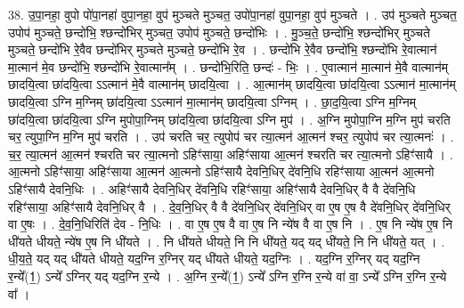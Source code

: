 \documentclass[17pt]{extarticle}
\begin{document}
38. उ॒पा॒नहा॒ वुपो पो॑पा॒नहा॑ वुपा॒नहा॒ वुप॑ मुञ्चते मुञ्चत॒ उपो॑पा॒नहा॑ वुपा॒नहा॒ वुप॑ मुञ्चते । . उप॑ मुञ्चते मुञ्चत॒ उपोप॑ मुञ्चते॒ छन्दो॑भि॒ श्छन्दो॑भिर् मुञ्चत॒ उपोप॑ मुञ्चते॒ छन्दो॑भिः । . मु॒ञ्च॒ते॒ छन्दो॑भि॒ श्छन्दो॑भिर् मुञ्चते मुञ्चते॒ छन्दो॑भि रे॒वैव छन्दो॑भिर् मुञ्चते मुञ्चते॒ छन्दो॑भि रे॒व । . छन्दो॑भि रे॒वैव छन्दो॑भि॒ श्छन्दो॑भि रे॒वात्मान॑ मा॒त्मान॑ मे॒व छन्दो॑भि॒ श्छन्दो॑भि रे॒वात्मान᳚म् । . छन्दो॑भि॒रिति॒ छन्दः॑ - भिः॒ । . ए॒वात्मान॑ मा॒त्मान॑ मे॒वै वात्मान॑म् छादयि॒त्वा छा॑दयि॒त्वा ऽऽत्मान॑ मे॒वै वात्मान॑म् छादयि॒त्वा । . आ॒त्मान॑म् छादयि॒त्वा छा॑दयि॒त्वा ऽऽत्मान॑ मा॒त्मान॑म् छादयि॒त्वा ऽग्नि म॒ग्निम् छा॑दयि॒त्वा ऽऽत्मान॑ मा॒त्मान॑म् छादयि॒त्वा ऽग्निम् । . छा॒द॒यि॒त्वा ऽग्नि म॒ग्निम् छा॑दयि॒त्वा छा॑दयि॒त्वा ऽग्नि मुपोपा॒ग्निम् छा॑दयि॒त्वा छा॑दयि॒त्वा ऽग्नि मुप॑ । . अ॒ग्नि मुपोपा॒ग्नि म॒ग्नि मुप॑ चरति चर॒ त्युपा॒ग्नि म॒ग्नि मुप॑ चरति । . उप॑ चरति चर॒ त्युपोप॑ चर त्या॒त्मन॑ आ॒त्मन॑ श्चर॒ त्युपोप॑ चर त्या॒त्मनः॑ । . च॒र॒ त्या॒त्मन॑ आ॒त्मन॑ श्चरति चर त्या॒त्मनो ऽहिꣳ॑साया॒ अहिꣳ॑साया आ॒त्मन॑ श्चरति चर त्या॒त्मनो ऽहिꣳ॑सायै । . आ॒त्मनो ऽहिꣳ॑साया॒ अहिꣳ॑साया आ॒त्मन॑ आ॒त्मनो ऽहिꣳ॑सायै देवनि॒धिर् दे॑वनि॒धि रहिꣳ॑साया आ॒त्मन॑ आ॒त्मनो ऽहिꣳ॑सायै देवनि॒धिः । . अहिꣳ॑सायै देवनि॒धिर् दे॑वनि॒धि रहिꣳ॑साया॒ अहिꣳ॑सायै देवनि॒धिर् वै वै दे॑वनि॒धि रहिꣳ॑साया॒ अहिꣳ॑सायै देवनि॒धिर् वै । . दे॒व॒नि॒धिर् वै वै दे॑वनि॒धिर् दे॑वनि॒धिर् वा ए॒ष ए॒ष वै दे॑वनि॒धिर् दे॑वनि॒धिर् वा ए॒षः । . दे॒व॒नि॒धिरिति॑ देव - नि॒धिः । . वा ए॒ष ए॒ष वै वा ए॒ष नि न्ये॑ष वै वा ए॒ष नि । . ए॒ष नि न्ये॑ष ए॒ष नि धी॑यते धीयते॒ न्ये॑ष ए॒ष नि धी॑यते । . नि धी॑यते धीयते॒ नि नि धी॑यते॒ यद् यद् धी॑यते॒ नि नि धी॑यते॒ यत् । . धी॒य॒ते॒ यद् यद् धी॑यते धीयते॒ यद॒ग्नि र॒ग्निर् यद् धी॑यते धीयते॒ यद॒ग्निः । . यद॒ग्नि र॒ग्निर् यद् यद॒ग्नि र॒न्ये᳚(1॒) ऽन्ये᳚ ऽग्निर् यद् यद॒ग्नि र॒न्ये । . अ॒ग्नि र॒न्ये᳚(1॒) ऽन्ये᳚ ऽग्नि र॒ग्नि र॒न्ये वा॑ वा॒ ऽन्ये᳚ ऽग्नि र॒ग्नि र॒न्ये वा᳚ । \newline
\pagebreak
{}
\end{document}
